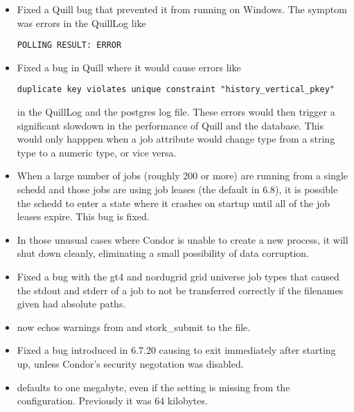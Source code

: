 \begin{itemize}

\item Fixed a Quill bug that prevented it from running on Windows.  The
symptom was errors in the QuillLog like
\begin{verbatim}
POLLING RESULT: ERROR
\end{verbatim}

\item Fixed a bug in Quill where it would cause errors like
\begin{verbatim}
duplicate key violates unique constraint "history_vertical_pkey"
\end{verbatim}
in the QuillLog and the postgres log file.  These errors would then trigger
a significant slowdown in the performance of Quill and the database.  This
would only happpen when a job attribute would change type from a string
type to a numeric type, or vice versa.

\item When a large number of jobs (roughly 200 or more) are running from a
single schedd and those jobs are using job leases (the default in 6.8), it is
possible the schedd to enter a state where it crashes on startup until all of
the job leases expire.  This bug is fixed.

\item In those unusual cases where Condor is unable to create a new process,
it will shut down cleanly, eliminating a small possibility of data corruption.

\item Fixed a bug with the gt4 and nordugrid grid universe job types that
caused the stdout and stderr of a job to not be transferred correctly if
the filenames given had absolute paths.

\item {} now echos warnings from  and
stork\_submit to the  file.

\item Fixed a bug introduced in 6.7.20 causing 
to exit immediately after starting up, unless Condor's security
negotation was disabled.

\item {} defaults to one megabyte, even if the
setting is missing from the configuration.  Previously it was 64 kilobytes.


\end{itemize}
